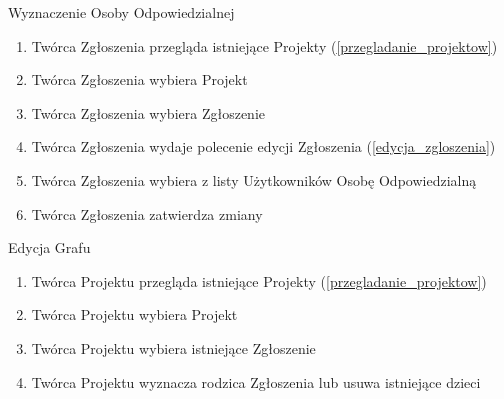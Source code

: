 \begin{usecase}{Wyznaczenie Osoby Odpowiedzialnej}
\label{wyznaczenie_osoby_odpowiedzialnej}
	\begin{enumerate}
    \item Twórca Zgłoszenia przegląda istniejące Projekty (\ref{przegladanie_projektow})
  	\item Twórca Zgłoszenia wybiera Projekt
  	\item Twórca Zgłoszenia wybiera Zgłoszenie
  	\item Twórca Zgłoszenia wydaje polecenie edycji Zgłoszenia (\ref{edycja_zgloszenia})
  	\item Twórca Zgłoszenia wybiera z listy Użytkowników Osobę Odpowiedzialną
  	\item Twórca Zgłoszenia zatwierdza zmiany
	\end{enumerate}
    
\end{usecase}

\begin{usecase}{Edycja Grafu}
	\begin{enumerate}
    \item Twórca Projektu przegląda istniejące Projekty (\ref{przegladanie_projektow})
    \item Twórca Projektu wybiera Projekt
    \item Twórca Projektu wybiera istniejące Zgłoszenie
    \item Twórca Projektu wyznacza rodzica Zgłoszenia lub usuwa istniejące dzieci
	\end{enumerate}
\end{usecase}


